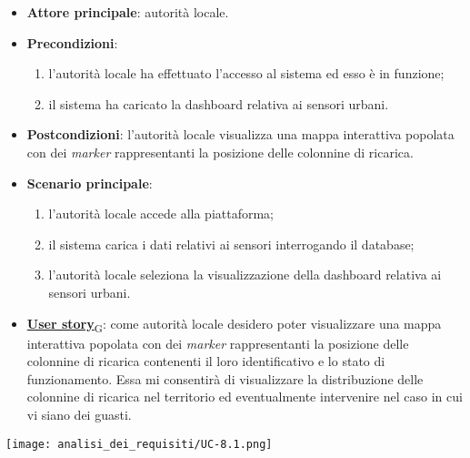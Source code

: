 \begin{itemize}
	\item \textbf{Attore principale}: autorità locale.
	\item \textbf{Precondizioni}:
	      \begin{enumerate}
		      \item l'autorità locale ha effettuato l'accesso al sistema ed esso è in funzione;
		      \item il sistema ha caricato la dashboard relativa ai sensori urbani.
	      \end{enumerate}
	\item \textbf{Postcondizioni}: l'autorità locale visualizza una mappa interattiva popolata con dei \textit{marker} rappresentanti la posizione delle colonnine di ricarica.
	\item \textbf{Scenario principale}:
	      \begin{enumerate}
		      \item l'autorità locale accede alla piattaforma;
		      \item il sistema carica i dati relativi ai sensori interrogando il database;
		      \item l'autorità locale seleziona la visualizzazione della dashboard relativa ai sensori urbani.
	      \end{enumerate}
	\item \href{https://7last.github.io/docs/pb/documentazione-interna/glossario\#user-story}{\textbf{User story}\textsubscript{G}}:
	      come autorità locale desidero poter visualizzare una mappa interattiva popolata con dei \textit{marker} rappresentanti la posizione delle colonnine di ricarica
	      contenenti il loro identificativo e lo stato di funzionamento. Essa mi consentirà di visualizzare la distribuzione delle colonnine di ricarica nel territorio
	      ed eventualmente intervenire nel caso in cui vi siano dei guasti.
\end{itemize}
\begin{center}
	\texttt{[image: analisi\_dei\_requisiti/UC-8.1.png]}
\end{center}


